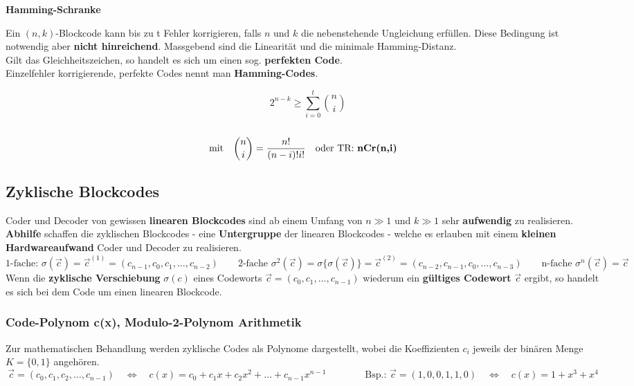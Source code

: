 \textbf{Hamming-Schranke}\\
\begin{minipage}{12cm}
	Ein $(n,k)$-Blockcode kann bis zu t Fehler korrigieren, falls $n$
	und $k$ die nebenstehende Ungleichung erfüllen. Diese Bedingung ist notwendig aber \textbf{nicht
	hinreichend}. Massgebend sind die Linearität und die minimale Hamming-Distanz. \\
	Gilt das Gleichheitszeichen, so handelt es sich um einen sog. \textbf{perfekten Code}. \\
	Einzelfehler korrigierende, perfekte Codes nennt man \textbf{Hamming-Codes}.
\end{minipage} 
\begin{minipage}{7cm}
	$$ \qquad 2^{n-k} \geq \sum\limits_{i=0}^{t} \binom{n}{i} \quad$$ \\
	$$ \text{mit} \quad \binom{n}{i} = \dfrac{n!}{(n-i)! i!} \quad \text{oder TR: \textbf{nCr(n,i)}}$$
\end{minipage}

\newpage

\subsection{Zyklische Blockcodes }
Coder und Decoder von gewissen \textbf{linearen Blockcodes} sind ab einem Umfang von $n \gg 1$ und
$k \gg 1$ sehr \textbf{aufwendig} zu realisieren. \\
\textbf{Abhilfe} schaffen die zyklischen Blockcodes - eine \textbf{Untergruppe} der linearen Blockcodes -
welche es erlauben mit einem \textbf{kleinen Hardwareaufwand} Coder und Decoder zu realisieren. 
$$ \text{1-fache: }\sigma(\vec{c}) = \vec{c}^{(1)} = (c_{n-1}, c_0, c_1, \ldots, c_{n-2}) \qquad 
 \text{2-fache }\sigma^2(\vec{c}) = \sigma\{\sigma(\vec{c})\}= \vec{c}^{(2)} = (c_{n-2}, c_{n-1}, c_0, \ldots, c_{n-3}) \qquad
 \text{n-fache }\sigma^n(\vec{c}) = \vec{c} $$
Wenn die \textbf{zyklische Verschiebung} $\sigma (c)$ eines Codeworts $\vec{c} = (c_0, c_1, \ldots,
c_{n-1})$ wiederum ein \textbf{gültiges Codewort} $\vec{c}$ ergibt, so handelt es sich bei dem Code um
einen linearen Blockcode.


\subsubsection{Code-Polynom c(x), Modulo-2-Polynom Arithmetik}
Zur mathematischen Behandlung werden zyklische Codes als Polynome dargestellt, wobei die
Koeffizienten $c_i$ jeweils der binären Menge $K=\{0,1\}$ angehören.
$$ \vec{c} = (c_0, c_1, c_2, \ldots,
c_{n-1}) \quad \Longleftrightarrow \quad c(x) = c_0 + c_1 x + c_2 x^2 + \ldots + c_{n-1} x^{n-1} 
\qquad \qquad \text{Bsp.: } \vec{c} = (1, 0, 0, 1, 1, 0) \quad \Longleftrightarrow \quad c(x) = 1 + x^3 +
x^4$$

